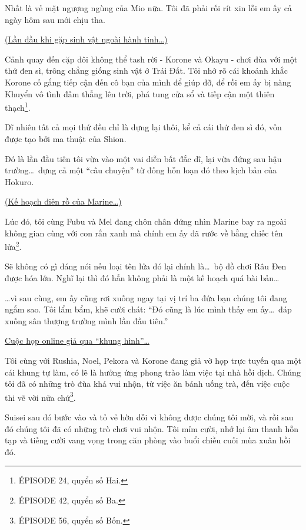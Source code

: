 \documentclass[../main.tex]{subfiles}
\begin{document}
Nhất là vẻ mặt ngượng ngùng của Mio nữa. Tôi đã phải rối rít xin lỗi em ấy cả ngày hôm sau mới chịu tha.

\begin{center}
    \uline{(Lần đầu khi gặp sinh vật ngoài hành tinh\dots)}
\end{center}

Cảnh quay đến cặp đôi không thể tash rời - Korone và Okayu - chơi đùa với một thứ đen sì, trông chẳng giống sinh vật ở Trái Đất. Tôi nhớ rõ cái khoảnh khắc Korone cố gắng tiếp cận đến cô bạn của mình để giúp đỡ, để rồi em ấy bị nàng Khuyển vô tình đấm thẳng lên trời, phá tung cửa sổ và tiếp cận một thiên thạch\footnote{{\flaregothic ÉPISODE 24}, quyển số Hai.}.

Dĩ nhiên tất cả mọi thứ đều chỉ là dựng lại thôi, kể cả cái thứ đen sì đó, vốn được tạo bởi ma thuật của Shion.

Đó là lần đầu tiên tôi vừa vào một vai diễn bất đắc dĩ, lại vừa đứng sau hậu trường\dots\ dựng cả một ``câu chuyện'' từ đống hỗn loạn đó theo kịch bản của Hokuro.

\begin{center}
    \uline{(Kế hoạch điên rồ của Marine\dots)}
\end{center}

Lúc đó, tôi cùng Fubu và Mel đang chôn chân đứng nhìn Marine bay ra ngoài không gian cùng với con rắn xanh mà chính em ấy đã rước về bằng chiếc tên lửa\footnote{{\flaregothic ÉPISODE 42}, quyển số Ba.}.

Sẽ không có gì đáng nói nếu loại tên lửa đó lại chính là\dots\ bộ đồ chơi Râu Đen được hóa lớn. Nghĩ lại thì đó hẳn không phải là một kế hoạch quá bài bản\dots

\dots vì sau cùng, em ấy cũng rơi xuống ngay tại vị trí ba đứa bạn chúng tôi đang ngắm sao. Tôi lẩm bẩm, khẽ cười chát: ``Đó cũng là lúc mình thấy em ấy\dots\ đáp xuống sân thượng trường mình lần đầu tiên.''

\begin{center}
    \uline{Cuộc họp online giả qua ``khung hình''\dots}
\end{center}

Tôi cùng với Rushia, Noel, Pekora và Korone đang giả vờ họp trực tuyến qua một cái khung tự làm, có lẽ là hưởng ứng phong trào làm việc tại nhà hồi dịch. Chúng tôi đã có những trò đùa khá vui nhộn, từ việc ăn bánh uống trà, đến việc cuộc thi vẽ vời nữa chứ\footnote{{\flaregothic ÉPISODE 56}, quyển số Bốn.}.

Suisei sau đó bước vào và tỏ vẻ hờn dỗi vì không được chúng tôi mời, và rồi sau đó chúng tôi đã có những trò chơi vui nhộn. Tôi mỉm cười, nhớ lại âm thanh hỗn tạp và tiếng cười vang vọng trong căn phòng vào buổi chiều cuối mùa xuân hồi đó.
\end{document}
